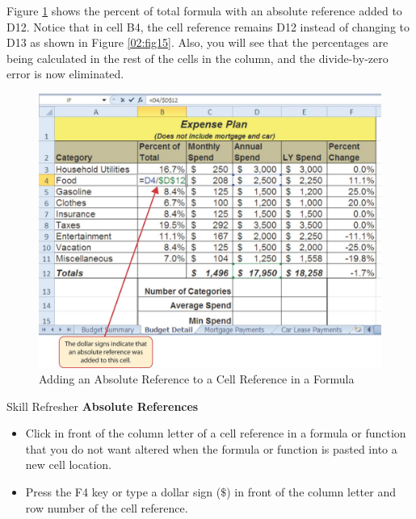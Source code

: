 Figure \ref{02:fig16} shows the percent of total formula with an absolute reference added to \textsf{D12}. Notice that in cell \textsf{B4}, the cell reference remains \textsf{D12} instead of changing to \textsf{D13} as shown in Figure \ref{02:fig15}. Also, you will see that the percentages are being calculated in the rest of the cells in the column, and the divide-by-zero error is now eliminated.

\begin{figure}[H]
	\centering
	\includegraphics[width=\maxwidth{.95\linewidth}]{gfx/ch02_fig16}
	\caption{Adding an Absolute Reference to a Cell Reference in a Formula}
	\label{02:fig16}
\end{figure}

\begin{center}
	\begin{sklbox}{Skill Refresher}
		\textbf{Absolute References}
		\\
		\begin{itemize}
			\setlength{\itemsep}{0pt}
			\setlength{\parskip}{0pt}
			\setlength{\parsep}{0pt}
			
			\item Click in front of the column letter of a cell reference in a formula or function that you do not want altered when the formula or function is pasted into a new cell location.
			\item Press the F4 key or type a dollar sign ($ \$ $) in front of the column letter and row number of the cell reference.

		\end{itemize}
	\end{sklbox}
\end{center}

